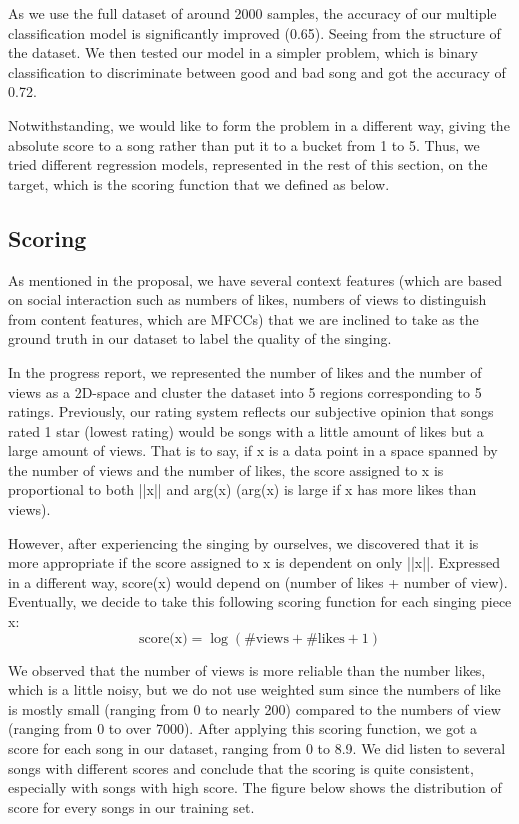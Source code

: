 \documentclass[paper=a4, fontsize=11pt, DIV=13]{scrartcl}
\begin{document}
As we use the full dataset of around 2000 samples, the accuracy of our multiple classification model is significantly improved (0.65). Seeing from the structure of the dataset. We then tested our model in a simpler problem, which is binary classification to discriminate between good and bad song and got the accuracy of 0.72.

Notwithstanding, we would like to form the problem in a different way, giving the absolute score to a song rather than put it to a bucket from 1 to 5. Thus, we tried different regression models, represented in the rest of this section, on the target, which is the scoring function that we defined as below.

\subsection{Scoring}
As mentioned in the proposal, we have several context features (which are based on social interaction such as numbers of likes, numbers of views to distinguish from content features, which are MFCCs) that we are inclined to take as the ground truth in our dataset to label the quality of the singing. 

In the progress report, we represented the number of likes and the number of views as a 2D-space and cluster the dataset into 5 regions corresponding to 5 ratings. Previously, our rating system reflects our subjective opinion that songs rated 1 star (lowest rating) would be songs with a little amount of likes but a large amount of views. That is to say, if x is a data point in a space spanned by the number of views and the number of likes, the score assigned to x is proportional to both ||x|| and arg(x) (arg(x) is large if x has more likes than views). 

However, after experiencing the singing by ourselves, we discovered that it is more appropriate if the score assigned to x is dependent on only ||x||. Expressed in a different way, score(x) would depend on (number of likes + number of view). Eventually, we decide to take this following scoring function for each singing piece x:
\begin{equation}
\text{score(x)} = \log(\text{\#views} + \text{\#likes} +1) \nonumber
\end{equation}

We observed that the number of views is more reliable than the number likes, which is a little noisy, but we do not use weighted sum since the numbers of like is mostly small (ranging from 0 to nearly 200) compared to the numbers of view (ranging from 0 to over 7000). After applying this scoring function, we got a score for each song in our dataset, ranging from 0 to 8.9. We did listen to several songs with different scores and conclude that the scoring is quite consistent, especially with songs with high score. The figure below shows the distribution of score for every songs in our training set.
\end{document}
